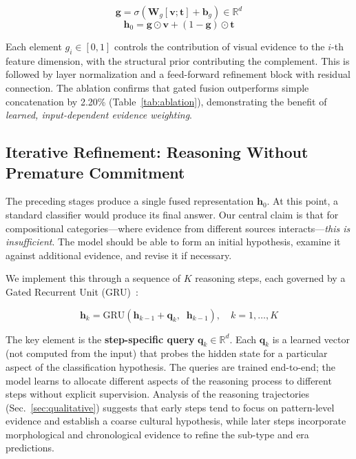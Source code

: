 \documentclass[10pt,twocolumn,letterpaper]{article}
\begin{document}
\begin{equation}
\mathbf{g} = \sigma(\mathbf{W}_g[\mathbf{v}; \mathbf{t}] + \mathbf{b}_g) \in \mathbb{R}^{d}
\label{eq:gate}
\end{equation}
\begin{equation}
\mathbf{h}_0 = \mathbf{g} \odot \mathbf{v} + (1 - \mathbf{g}) \odot \mathbf{t}
\label{eq:fused}
\end{equation}

Each element $g_i \in [0, 1]$ controls the contribution of visual evidence to the $i$-th feature dimension, with the structural prior contributing the complement. This is followed by layer normalization and a feed-forward refinement block with residual connection. The ablation confirms that gated fusion outperforms simple concatenation by 2.20\% (Table~\ref{tab:ablation}), demonstrating the benefit of \emph{learned, input-dependent evidence weighting}.

\subsection{Iterative Refinement: Reasoning Without Premature Commitment}
\label{sec:iterative}

The preceding stages produce a single fused representation $\mathbf{h}_0$. At this point, a standard classifier would produce its final answer. Our central claim is that for compositional categories---where evidence from different sources interacts---\emph{this is insufficient}. The model should be able to form an initial hypothesis, examine it against additional evidence, and revise it if necessary.

We implement this through a sequence of $K$ reasoning steps, each governed by a Gated Recurrent Unit (GRU)~\cite{cho2014learning}:

\begin{equation}
\mathbf{h}_k = \text{GRU}(\mathbf{h}_{k-1} + \mathbf{q}_k, \;\; \mathbf{h}_{k-1}), \quad k = 1, \ldots, K
\label{eq:gru}
\end{equation}

The key element is the \textbf{step-specific query} $\mathbf{q}_k \in \mathbb{R}^{d}$. Each $\mathbf{q}_k$ is a learned vector (not computed from the input) that probes the hidden state for a particular aspect of the classification hypothesis. The queries are trained end-to-end; the model learns to allocate different aspects of the reasoning process to different steps without explicit supervision. Analysis of the reasoning trajectories (Sec.~\ref{sec:qualitative}) suggests that early steps tend to focus on pattern-level evidence and establish a coarse cultural hypothesis, while later steps incorporate morphological and chronological evidence to refine the sub-type and era predictions.
\end{document}
